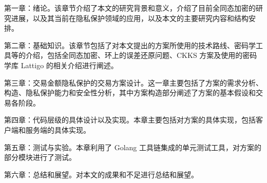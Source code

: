 第一章：绪论。该章节介绍了本文的研究背景和意义，介绍了目前全同态加密的研究进展，以及其当前在隐私保护领域的应用，以及本文的主要研究内容和结构安排。

第二章：基础知识。该章节包括了对本文提出的方案所使用的技术路线、密码学工具等的介绍，包括全同态加密、环上的误差还原问题、CKKS 方案及使用的密码学库 Lattigo 的相关介绍进行阐述。

第三章：交易金额隐私保护的交易方案设计。这一章主要包括了方案的需求分析、构造、隐私保护能力和安全性分析，其中方案构造部分阐述了方案的基本假设和交易各阶段。

第四章：代码层级的具体设计以及实现。本章主要包括对方案的具体实现，包括客户端和服务端的具体实现。

第五章：测试与实验。本章利用了 Golang 工具链集成的单元测试工具，对方案的部分模块进行了测试。

第六章：总结和展望。对本文的成果和不足进行总结和展望。
